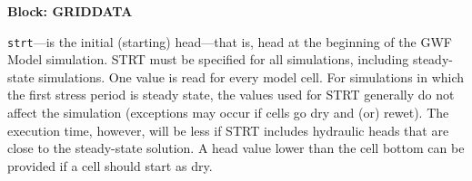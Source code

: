 
\item \textbf{Block: GRIDDATA}

\begin{description}
\item \texttt{strt}---is the initial (starting) head---that is, head at the beginning of the GWF Model simulation.  STRT must be specified for all simulations, including steady-state simulations. One value is read for every model cell. For simulations in which the first stress period is steady state, the values used for STRT generally do not affect the simulation (exceptions may occur if cells go dry and (or) rewet). The execution time, however, will be less if STRT includes hydraulic heads that are close to the steady-state solution.  A head value lower than the cell bottom can be provided if a cell should start as dry.

\end{description}

